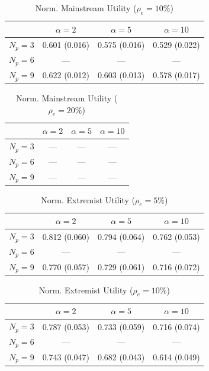 \begin{table}[htbp]
\centering
\begin{tabular}{lccc}
\toprule
 & $\alpha=2$ & $\alpha=5$ & $\alpha=10$ \\
\midrule
$N_p=3$ & 0.601 (0.016) & 0.575 (0.016) & 0.529 (0.022) \\
$N_p=6$ & --- & --- & --- \\
$N_p=9$ & 0.622 (0.012) & 0.603 (0.013) & 0.578 (0.017) \\
\bottomrule
\end{tabular}
\caption{Norm. Mainstream Utility ($\rho_e=10\%$)}
\label{tab:exp2_norm_utility_mainstream_rho10}
\end{table}


\begin{table}[htbp]
\centering
\begin{tabular}{lccc}
\toprule
 & $\alpha=2$ & $\alpha=5$ & $\alpha=10$ \\
\midrule
$N_p=3$ & --- & --- & --- \\
$N_p=6$ & --- & --- & --- \\
$N_p=9$ & --- & --- & --- \\
\bottomrule
\end{tabular}
\caption{Norm. Mainstream Utility ($\rho_e=20\%$)}
\label{tab:exp2_norm_utility_mainstream_rho20}
\end{table}


\begin{table}[htbp]
\centering
\begin{tabular}{lccc}
\toprule
 & $\alpha=2$ & $\alpha=5$ & $\alpha=10$ \\
\midrule
$N_p=3$ & 0.812 (0.060) & 0.794 (0.064) & 0.762 (0.053) \\
$N_p=6$ & --- & --- & --- \\
$N_p=9$ & 0.770 (0.057) & 0.729 (0.061) & 0.716 (0.072) \\
\bottomrule
\end{tabular}
\caption{Norm. Extremist Utility ($\rho_e=5\%$)}
\label{tab:exp2_norm_utility_extremist_rho5}
\end{table}


\begin{table}[htbp]
\centering
\begin{tabular}{lccc}
\toprule
 & $\alpha=2$ & $\alpha=5$ & $\alpha=10$ \\
\midrule
$N_p=3$ & 0.787 (0.053) & 0.733 (0.059) & 0.716 (0.074) \\
$N_p=6$ & --- & --- & --- \\
$N_p=9$ & 0.743 (0.047) & 0.682 (0.043) & 0.614 (0.049) \\
\bottomrule
\end{tabular}
\caption{Norm. Extremist Utility ($\rho_e=10\%$)}
\label{tab:exp2_norm_utility_extremist_rho10}
\end{table}


